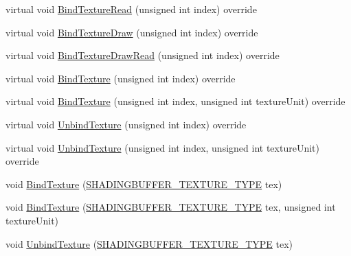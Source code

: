 \begin{DoxyCompactItemize}
virtual void \mbox{\hyperlink{class_geometry_engine_1_1_geometry_buffer_1_1_shading_buffer_afe933c5c15ed7e488f5094ef2ddf8c4b}{Bind\+Texture\+Read}} (unsigned int index) override
\item 
virtual void \mbox{\hyperlink{class_geometry_engine_1_1_geometry_buffer_1_1_shading_buffer_ab7598c22cfdc926a5fea29734160c10b}{Bind\+Texture\+Draw}} (unsigned int index) override
\item 
virtual void \mbox{\hyperlink{class_geometry_engine_1_1_geometry_buffer_1_1_shading_buffer_ad11150c070d2b598864a227d48919237}{Bind\+Texture\+Draw\+Read}} (unsigned int index) override
\item 
virtual void \mbox{\hyperlink{class_geometry_engine_1_1_geometry_buffer_1_1_shading_buffer_adaf685676711e22a36cd5d10b6fd7752}{Bind\+Texture}} (unsigned int index) override
\item 
virtual void \mbox{\hyperlink{class_geometry_engine_1_1_geometry_buffer_1_1_shading_buffer_ad700e0216094073a3c441de7ed22b816}{Bind\+Texture}} (unsigned int index, unsigned int texture\+Unit) override
\item 
virtual void \mbox{\hyperlink{class_geometry_engine_1_1_geometry_buffer_1_1_shading_buffer_a7c5594fbcc9e0cd43f4b6ebb8e9b9197}{Unbind\+Texture}} (unsigned int index) override
\item 
virtual void \mbox{\hyperlink{class_geometry_engine_1_1_geometry_buffer_1_1_shading_buffer_aa1731f2f7848509ac5c04fc417286454}{Unbind\+Texture}} (unsigned int index, unsigned int texture\+Unit) override
\item 
void \mbox{\hyperlink{class_geometry_engine_1_1_geometry_buffer_1_1_shading_buffer_a5c7fdd4a5e773750005956bdd923759e}{Bind\+Texture}} (\mbox{\hyperlink{class_geometry_engine_1_1_geometry_buffer_1_1_shading_buffer_a8047a079ff9fb9fa3400651664c92ae9}{S\+H\+A\+D\+I\+N\+G\+B\+U\+F\+F\+E\+R\+\_\+\+T\+E\+X\+T\+U\+R\+E\+\_\+\+T\+Y\+PE}} tex)
\item 
void \mbox{\hyperlink{class_geometry_engine_1_1_geometry_buffer_1_1_shading_buffer_a1122ec03dd6ffcaf19ac4370b1ef5cb8}{Bind\+Texture}} (\mbox{\hyperlink{class_geometry_engine_1_1_geometry_buffer_1_1_shading_buffer_a8047a079ff9fb9fa3400651664c92ae9}{S\+H\+A\+D\+I\+N\+G\+B\+U\+F\+F\+E\+R\+\_\+\+T\+E\+X\+T\+U\+R\+E\+\_\+\+T\+Y\+PE}} tex, unsigned int texture\+Unit)
\item 
void \mbox{\hyperlink{class_geometry_engine_1_1_geometry_buffer_1_1_shading_buffer_acd58b856df03ec7eec5313356c3f8c46}{Unbind\+Texture}} (\mbox{\hyperlink{class_geometry_engine_1_1_geometry_buffer_1_1_shading_buffer_a8047a079ff9fb9fa3400651664c92ae9}{S\+H\+A\+D\+I\+N\+G\+B\+U\+F\+F\+E\+R\+\_\+\+T\+E\+X\+T\+U\+R\+E\+\_\+\+T\+Y\+PE}} tex)

\end{DoxyCompactItemize}
